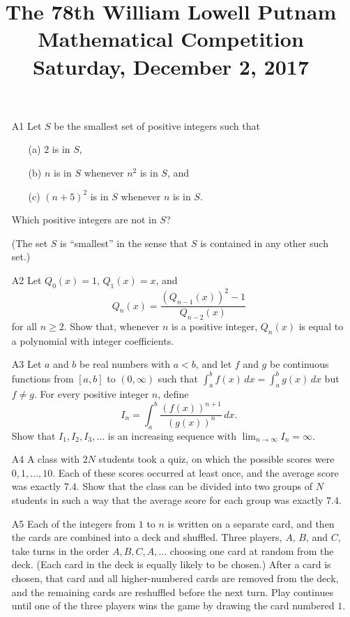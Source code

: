 \documentclass[amssymb,twocolumn,pra,10pt,aps]{revtex4-1}
\begin{document}
\title{The 78th William Lowell Putnam Mathematical Competition \\
    Saturday, December 2, 2017}
\maketitle

\begin{itemize}

\item[A1] 
Let $S$ be the smallest set of positive integers such that
\begin{enumerate}
\item[(a)]
$2$ is in $S$,
\item[(b)]
$n$ is in $S$ whenever $n^2$ is in $S$, and
\item[(c)]
$(n+5)^2$ is in $S$ whenever $n$ is in $S$.
\end{enumerate}
Which positive integers are not in $S$?

(The set $S$ is ``smallest'' in the sense that $S$ is contained in any other such set.)

\item[A2]
Let $Q_0(x) = 1$, $Q_1(x) = x$, and
\[
Q_n(x) = \frac{(Q_{n-1}(x))^2 - 1}{Q_{n-2}(x)}
\]
for all $n \geq 2$. Show that, whenever $n$ is a positive integer, $Q_n(x)$ is equal to a polynomial with integer coefficients.

\item[A3]
Let $a$ and $b$ be real numbers with $a<b$, and let $f$ and $g$ be continuous functions from $[a,b]$ to $(0, \infty)$
such that $\int_a^b f(x)\,dx = \int_a^b g(x)\,dx$ but $f \neq g$. For every positive integer $n$, define
\[
I_n = \int_a^b \frac{(f(x))^{n+1}}{(g(x))^n}\,dx.
\]
Show that $I_1, I_2, I_3, \dots$ is an increasing sequence with $\lim_{n \to \infty} I_n = \infty$.

\item[A4]
A class with $2N$ students took a quiz, on which the possible scores were $0,1,\dots,10$. Each of these scores
occurred at least once, and the average score was exactly $7.4$. Show that the class can be divided into two groups of $N$ students in such a way that the average score for each group was exactly $7.4$.

\item[A5]
Each of the integers from $1$ to $n$ is written on a separate card, and then the cards are combined into a deck and shuffled. Three players, $A$, $B$, and $C$, take turns in the order $A,B,C,A,\dots$ choosing one card at random from the deck. (Each card in the deck is equally likely to be chosen.) After a card is chosen, that card and all higher-numbered cards are removed from the deck, and the remaining cards are reshuffled before the next turn. Play continues until one of the three players wins the game by drawing the card numbered $1$.


\end{itemize}
\end{document}
